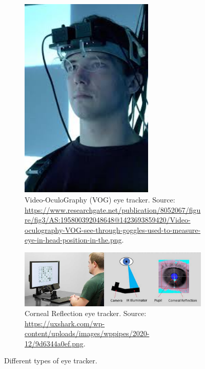 \documentclass[12pt]{report}
\begin{document}
\begin{figure}[ht]
    \vspace{0.5em}
    
    \begin{subfigure}[b]{0.45\textwidth}
        \centering
        \includegraphics[width=0.7\textwidth,height=0.6\textwidth]{Images/Theory/vog.jpeg}
        \caption{Video-OculoGraphy (VOG) eye tracker. Source: \url{https://www.researchgate.net/publication/8052067/figure/fig3/AS:195800392048648@1423693859420/Video-oculography-VOG-see-through-goggles-used-to-measure-eye-in-head-position-in-the.png}.}
        \label{fig:vog}
    \end{subfigure}
    \hfill
    \begin{subfigure}[b]{0.45\textwidth}
        \centering
        \includegraphics[width=1\textwidth,height=0.6\textwidth]{Images/Theory/corneal.jpg}
        \caption{Corneal Reflection eye tracker. Source: \url{https://uxshark.com/wp-content/uploads/images/wppipes/2020-12/9d6344a0ef.png}.}
        \label{fig:corneal}
    \end{subfigure}

    \caption{Different types of eye tracker.}
    \label{fig:four_grid}
\end{figure}
\end{document}
